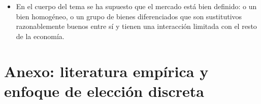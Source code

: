 \documentclass[11pt]{article}
\begin{document}
\begin{itemize}
\begin{itemize}
  \item el \emph{test del monopolista hipotético} (SSNIP), el de la práctica de la competencia: un conjunto de productos forma un mercado si un monopolista hipotético de todos ellos podría subir el precio de forma rentable entre un 5~y un 10~\% de manera duradera .
  \end{itemize}
\item En el cuerpo del tema se ha supuesto que el mercado está bien definido: o un bien homogéneo, o un grupo de bienes diferenciados que son sustitutivos razonablemente buenos entre sí y tienen una interacción limitada con el resto de la economía.
\end{itemize}

\section{Anexo: literatura empírica y enfoque de elección discreta}\label{anexo:empirica}
\end{document}
